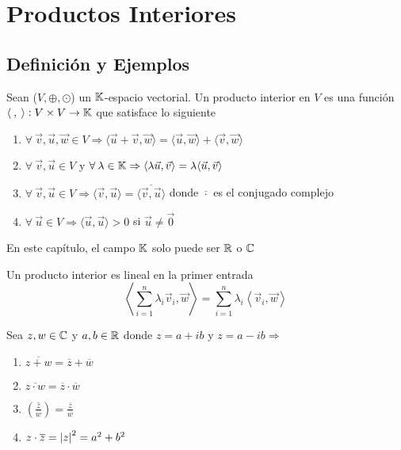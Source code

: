 \chapter{Productos Interiores}

\section{Definición y Ejemplos}

\begin{definition} 
    Sean ($V, \oplus, \odot$) un $\mathbb{K}$-espacio vectorial. Un producto interior en $V$ es una función $\langle \: , \: \rangle : V \times V \to \mathbb{K}$ que satisface lo siguiente

    \begin{enumerate} 
        \item $\forall \: \vec{v}, \vec{u}, \vec{w} \in V \Rightarrow \langle \vec{u}+ \vec{v}, \vec{w} \rangle = \langle \vec{u}, \vec{w} \rangle + \langle \vec{v}, \vec{w} \rangle$
        \item $\forall \: \vec{v}, \vec{u} \in V$ y $\forall \: \lambda \in \mathbb{K} \Rightarrow \langle \lambda \vec{u}, \vec{v} \rangle = \lambda  \langle \vec{u}, \vec{v} \rangle$
        \item $\forall \: \vec{v}, \vec{u} \in V \Rightarrow  \langle \vec{v}, \vec{u} \rangle =  \langle \overline{\vec{v}, \vec{u}} \rangle$ donde $\overline{\cdot}$ es el conjugado complejo
        \item $\forall \: \vec{u} \in V \Rightarrow  \langle \vec{u}, \vec{u} \rangle > 0$ si $\vec{u} \neq \vec{0}$
    \end{enumerate}
\end{definition}

\begin{notation}
    En este capítulo, el campo $\mathbb{K}$ solo puede ser $\mathbb{R}$ o $\mathbb{C}$
\end{notation}

\begin{corollary}
    Un producto interior es lineal en la primer entrada
    $$\left\langle \sum_{i=1}^{n} \lambda_i {\vec{v}}_{i}, \vec{w} \right\rangle = \sum_{i=1}^{n}\lambda_i  \left\langle {\vec{v}}_{i}, \vec{w} \right\rangle$$
\end{corollary}

\begin{remark}
    Sea $z, w \in \mathbb{C}$ y $a, b \in \mathbb{R}$ donde $z = a + ib$ y $z = a - ib \Rightarrow$

    \begin{enumerate}
        \item $\overline{z+w} = \overline{z} + \overline{w}$
        \item $\overline{z \cdot w} = \overline{z} \cdot \overline{w}$
        \item $\left( \overline{\frac{z}{w}} \right) = \frac{\overline{z}}{\overline{w}}$
        \item $z \cdot \overline{z} = \abs{z}^2 = a^2 + b^2$
    \end{enumerate}
\end{remark}

